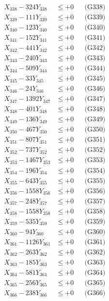 \documentclass[a4paper,10pt]{article}
\begin{document}
{\begin{align}
X_{338} - 324Y_{338} &\leq +0 && \text{(G338)} \\
X_{339} - 111Y_{339} &\leq +0 && \text{(G339)} \\
X_{340} - 123Y_{340} &\leq +0 && \text{(G340)} \\
\allowbreak
X_{341} - 152Y_{341} &\leq +0 && \text{(G341)} \\
X_{342} - 441Y_{342} &\leq +0 && \text{(G342)} \\
X_{343} - 240Y_{343} &\leq +0 && \text{(G343)} \\
X_{344} - 509Y_{344} &\leq +0 && \text{(G344)} \\
X_{345} - 33Y_{345} &\leq +0 && \text{(G345)} \\
X_{346} - 24Y_{346} &\leq +0 && \text{(G346)} \\
X_{347} - 1392Y_{347} &\leq +0 && \text{(G347)} \\
X_{348} - 401Y_{348} &\leq +0 && \text{(G348)} \\
X_{349} - 136Y_{349} &\leq +0 && \text{(G349)} \\
X_{350} - 467Y_{350} &\leq +0 && \text{(G350)} \\
\allowbreak
X_{351} - 807Y_{351} &\leq +0 && \text{(G351)} \\
X_{352} - 737Y_{352} &\leq +0 && \text{(G352)} \\
X_{353} - 1467Y_{353} &\leq +0 && \text{(G353)} \\
X_{354} - 196Y_{354} &\leq +0 && \text{(G354)} \\
X_{355} - 643Y_{355} &\leq +0 && \text{(G355)} \\
X_{356} - 1558Y_{356} &\leq +0 && \text{(G356)} \\
X_{357} - 248Y_{357} &\leq +0 && \text{(G357)} \\
X_{358} - 1558Y_{358} &\leq +0 && \text{(G358)} \\
X_{359} - 535Y_{359} &\leq +0 && \text{(G359)} \\
X_{360} - 94Y_{360} &\leq +0 && \text{(G360)} \\
\allowbreak
X_{361} - 1126Y_{361} &\leq +0 && \text{(G361)} \\
X_{362} - 263Y_{362} &\leq +0 && \text{(G362)} \\
X_{363} - 185Y_{363} &\leq +0 && \text{(G363)} \\
X_{364} - 581Y_{364} &\leq +0 && \text{(G364)} \\
X_{365} - 256Y_{365} &\leq +0 && \text{(G365)} \\
X_{366} - 238Y_{366} &\leq +0 && \text{(G366)} \\

\end{align}}
\end{document}
